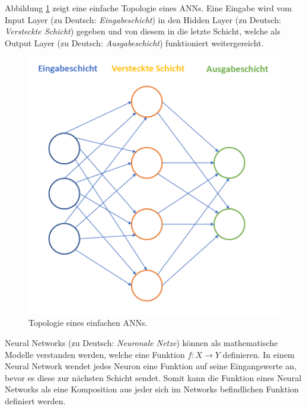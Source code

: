 


Abbildung \ref{fig:basictop} zeigt eine einfache Topologie eines ANNs. Eine Eingabe wird vom Input Layer (zu Deutsch: \textit{Eingabeschicht}) in den Hidden Layer (zu Deutsch: \textit{Versteckte Schicht}) gegeben und von diesem in die letzte Schicht, welche als Output Layer (zu Deutsch: \textit{Ausgabeschicht}) funktioniert weitergereicht. 

\begin{figure}[ht]
\centering
\includegraphics[scale=0.5]{pictures/grafiken/Folie3}
\caption[Caption for LOF]{Topologie eines einfachen ANNs.} 
\label{fig:basictop}
\end{figure}

Neural Networks (zu Deutsch: \textit{Neuronale Netze}) können als mathematische Modelle verstanden werden, welche eine Funktion $f : X \rightarrow Y$ definieren. In einem Neural Network wendet jedes Neuron eine Funktion auf seine Eingangswerte an, bevor es diese zur n\"achsten Schicht sendet. Somit kann die Funktion eines Neural Networks als eine Komposition aus jeder sich im Networks befindlichen Funktion definiert werden. 

